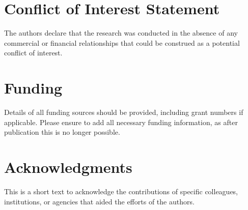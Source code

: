 \documentclass[utf8, a4paper, final, crop]{frontiersSCNS} %
\begin{document}
\section*{Conflict of Interest Statement}

The authors declare that the research was conducted in the absence of any commercial or financial relationships that could be construed as a potential conflict of interest.

%

\section*{Funding}

Details of all funding sources should be provided, including grant numbers if applicable. Please ensure to add all necessary funding information, as after publication this is no longer possible.

\section*{Acknowledgments}

This is a short text to acknowledge the contributions of specific colleagues, institutions, or agencies that aided the efforts of the authors.

\end{document}
